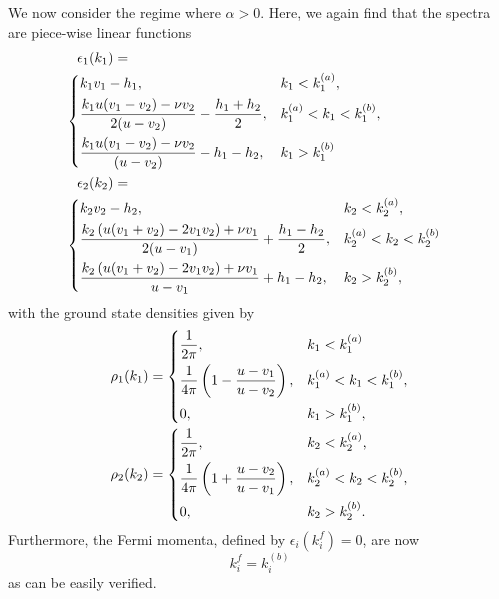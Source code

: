 \documentclass[aps,pra,
superscriptaddress,
reprint,twocolumn,preprintnumbers,
amsmath,amssymb,
nofootinbib]{revtex4-1}
\begin{document}
We now consider the regime where $\alpha >0$. Here, we again find that the spectra are piece-wise linear functions
		\begin{align}
		&\epsilon_1(k_1) = \nonumber \\
		&\hspace{-0.3cm}\begin{dcases}
		k_1 v_1 - h_1, & k_1<k_1^{(a)}, \\
		\frac {k_1 u (v_1-v_2) - \nu v_2}{2 (u-v_2)}  - \frac { h_1 + h_2}{2}, &  k_1^{(a)}<k_1<k_1^{(b)}, \\
		\frac {k_1 u (v_1-v_2) - \nu v_2}{ (u-v_2)}  -h_1 - h_2, & k_1>k_1^{(b)}
		\end{dcases} \\
		&\epsilon_2(k_2) = \nonumber \\
		&\hspace{-0.3cm}\begin{dcases}
		k_2 v_2 - h_2, & k_2<k_2^{(a)}, \\
		\frac{k_2 \left( u (v_1+v_2)-2 v_1 v_2 \right) + \nu v_1 }{2(u-v_1)} + \frac{h_1-h_2}{2} , & k_2^{(a)}<k_2<k_2^{(b)} \\
		\frac{k_2 \left( u (v_1+v_2)-2 v_1 v_2 \right) + \nu v_1 }{u-v_1} + h_1-h_2,  & k_2>k_2^{(b)},
		\end{dcases}
		\end{align}
with the ground state densities given by
        \begin{align}
        \rho_1(k_1) = 
        \begin{dcases}
        \frac{1}{2\pi}, &k_1<k_1^{(a)} \\
        \frac{1}{4\pi} \left(1 - \frac{u - v_1}{u - v_2} \right), &k_1^{(a)}<k_1<k_1^{(b)},\\
        0, &k_1>k_1^{(b)},
        \end{dcases} \\
        \rho_2(k_2) = 
        \begin{dcases}
        \frac{1}{2\pi}, &k_2<k_2^{(a)}, \\
        \frac{1}{4\pi} \left(1 + \frac{u - v_2}{u - v_1} \right), &k_2^{(a)}<k_2<k_2^{(b)},\\
        0, &k_2>k_2^{(b)}.
        \end{dcases}
        \end{align}  
 Furthermore, the Fermi momenta, defined by $\epsilon_i(k_i^f)=0$, are now 
 \begin{equation} k_i^f = k_i^{(b)}
 \end{equation}
 as can be easily verified. 
 
\end{document}

